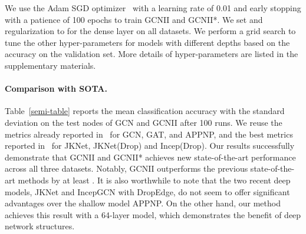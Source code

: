 \documentclass{article}
\begin{document}
We use  the Adam SGD optimizer~\cite{DBLP:journals/corr/KingmaB14}
with a learning rate of 0.01 and early stopping with a patience of 100
epochs to train GCNII and GCNII*. We set  and  regularization to  for
the dense layer on all datasets. 
We perform a grid search to tune the
other hyper-parameters for models with different depths based on the
accuracy on the validation set. More details of hyper-parameters are
listed in the supplementary
materials.

\paragraph{Comparison with SOTA.}
Table~\ref{semi-table} reports the mean classification accuracy with the standard deviation on
the test nodes of GCN and GCNII after 100 runs. We reuse the metrics
already reported in~\cite{Fey/Lenssen/2019}  for GCN, GAT, and APPNP,
and the best metrics reported in~\cite{rong2020dropedge} for JKNet,
JKNet(Drop) and Incep(Drop). Our results successfully demonstrate that
GCNII and GCNII* achieves new state-of-the-art performance across all
three datasets. Notably, GCNII outperforms the previous
state-of-the-art methods by at least . It is also worthwhile to
note that  the two recent deep models, JKNet and IncepGCN with DropEdge, do
not seem to offer significant advantages over the shallow model
APPNP. On the other hand, our method achieves this result with a 64-layer model, which
demonstrates the benefit of deep network structures. 
\end{document}
